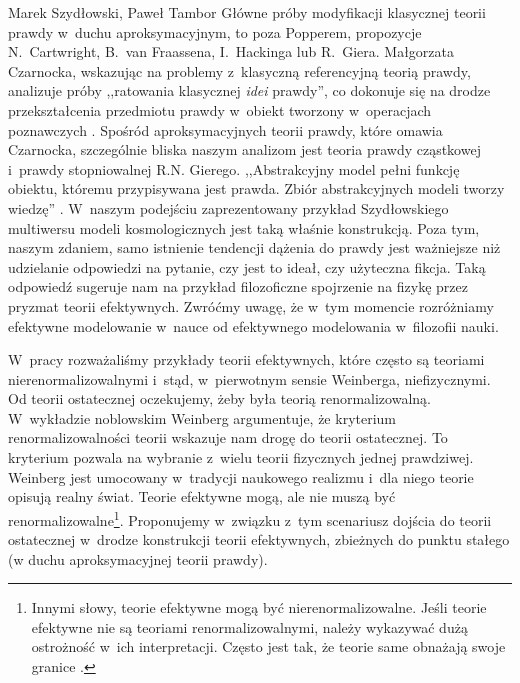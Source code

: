 \begin{artplenv2auth}{Marek Szydłowski, Paweł Tambor}
Główne próby modyfikacji klasycznej teorii prawdy w~duchu aproksymacyjnym, to poza Popperem, propozycje N.~Cartwright, B.~van Fraassena, I.~Hackinga lub R.~Giera. Małgorzata Czarnocka, wskazując na problemy z~klasyczną referencyjną teorią prawdy, analizuje próby ,,ratowania klasycznej \textit{idei} prawdy'', co dokonuje się na drodze przekształcenia przedmiotu prawdy w~obiekt tworzony w~operacjach poznawczych
\parencite[][s.~104]{czarnocka_modyfikacje_1996}. %
 Spośród aproksymacyjnych teorii prawdy, które omawia Czarnocka, szczególnie bliska naszym analizom jest teoria prawdy cząstkowej i~prawdy stopniowalnej R.N. Gierego. ,,Abstrakcyjny model pełni funkcję obiektu, któremu przypisywana jest prawda. Zbiór abstrakcyjnych modeli tworzy wiedzę'' 
\parencite[][s.~110]{czarnocka_modyfikacje_1996}. %
 W~naszym podejściu zaprezentowany przykład Szydłowskiego multiwersu modeli kosmologicznych jest taką właśnie konstrukcją. Poza tym, naszym zdaniem, samo istnienie tendencji dążenia do prawdy jest ważniejsze niż udzielanie odpowiedzi na pytanie, czy jest to ideał, czy użyteczna fikcja. Taką odpowiedź sugeruje nam na przykład filozoficzne spojrzenie na fizykę przez pryzmat teorii efektywnych. Zwróćmy uwagę, że w~tym momencie rozróżniamy efektywne modelowanie w~nauce od efektywnego modelowania w~filozofii nauki.

W~pracy rozważaliśmy przykłady teorii efektywnych, które często są teoriami nierenormalizowalnymi i~stąd, w~pierwotnym sensie Weinberga, niefizycznymi. Od teorii ostatecznej oczekujemy, żeby była teorią renormalizowalną. W~wykładzie noblowskim Weinberg argumentuje, że kryterium renormalizowalności teorii wskazuje nam drogę do teorii ostatecznej. To kryterium pozwala na wybranie z~wielu teorii fizycznych jednej prawdziwej. Weinberg jest umocowany w~tradycji naukowego realizmu i~dla niego teorie opisują realny świat. Teorie efektywne mogą, ale nie muszą być renormalizowalne\footnote{Innymi słowy, teorie efektywne mogą być nierenormalizowalne. Jeśli teorie efektywne nie są teoriami renormalizowalnymi, należy wykazywać dużą ostrożność w~ich interpretacji. Często jest tak, że teorie same obnażają swoje granice
\parencites[][]{golbiak_kosmologia_2005}[][]{butryn_czy_2011}.%
}. Proponujemy w~związku z~tym scenariusz dojścia do teorii ostatecznej w~drodze konstrukcji teorii efektywnych, zbieżnych do punktu stałego (w duchu aproksymacyjnej teorii prawdy).


\end{artplenv2auth}
